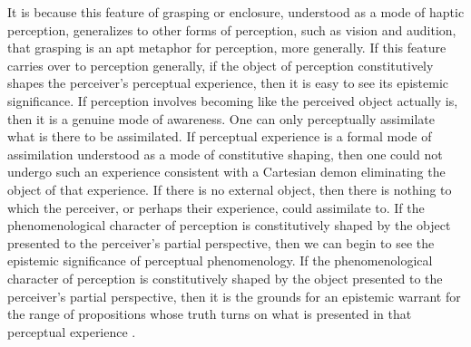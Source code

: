 It is because this feature of grasping or enclosure, understood as a mode of haptic perception, generalizes to other forms of perception, such as vision and audition, that grasping is an apt metaphor for perception, more generally. If this feature carries over to perception generally, if the object of perception constitutively shapes the perceiver's perceptual experience, then it is easy to see its epistemic significance. If perception involves becoming like the perceived object actually is, then it is a genuine mode of awareness. One can only perceptually assimilate what is there to be assimilated. If perceptual experience is a formal mode of assimilation understood as a mode of constitutive shaping, then one could not undergo such an experience consistent with a Cartesian demon eliminating the object of that experience. If there is no external object, then there is nothing to which the perceiver, or perhaps their experience, could assimilate to. If the phenomenological character of perception is constitutively shaped by the object presented to the perceiver’s partial perspective, then we can begin to see the epistemic significance of perceptual phenomenology. If the phenomenological character of perception is constitutively shaped by the object presented to the perceiver’s partial perspective, then it is the grounds for an epistemic warrant for the range of propositions whose truth turns on what is presented in that perceptual experience \citep{Johnston:2006uq,Johnston:2011fk,Kalderon:2011fk}.

